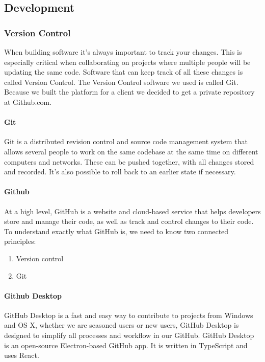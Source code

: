 \subsection{Development}
\subsubsection{Version Control}
When building software it’s always important to track your changes. This is especially critical when collaborating on projects where multiple people will be updating the same code. Software that can keep track of all
these changes is called Version Control. The Version Control software we used is called Git. Because we built
the platform for a client we decided to get a private repository at Github.com.

\paragraph*{Git}
Git is a distributed revision control and source code management system that
allows several people to work on the same codebase at the same time on different
computers and networks. These can be pushed together, with all changes stored and
recorded. It’s also possible to roll back to an earlier state if necessary.
\paragraph*{Github}
At a high level, GitHub is a website and cloud-based service that helps developers store and manage their code, as well as track and control changes to their code. To understand exactly what GitHub is, we need to know two connected principles:
\begin{enumerate}
      \item Version control
      \item Git
\end{enumerate}

\paragraph{Github Desktop}
GitHub Desktop is a fast and easy way to contribute to projects from Windows and OS X, whether we are seasoned users or new users, GitHub Desktop is designed to simplify all processes and workflow in our GitHub. GitHub Desktop is an open-source Electron-based GitHub app. It is written in TypeScript and uses React.



